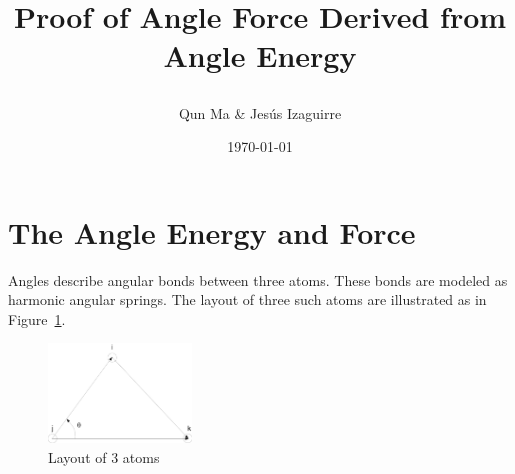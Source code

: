 \textheight 50pc
\textwidth 41pc
\topmargin -3.0pc
\oddsidemargin 0pc
\evensidemargin -1pc
\marginparsep -1pc
\marginparwidth 0pc


\newcommand{\comment}[1]{\textit{\small {#1}}}
\newcommand{\cpp}{C\texttt{++}\ }
\newcommand{\tcl}{\textsc{Tcl\ }}
\newcommand{\ProtoMol}{\textsc{ProtoMol\ }}
\newcommand{\SamdII}{\textsc{Samd 2\ }}
\newcommand{\MOLLY}{\textsc{MOLLY\ }}

\newcommand{\tempstart}{\texttt{<}}
\newcommand{\tempend}{\texttt{>}}
\newcommand{\rij}{\mbox{r$_{ij}$}}
\newcommand{\rik}{\mbox{r$_{ik}$}}
\newcommand{\vrij}{\mbox{$\vec{r}_{ij}$}}
\newcommand{\Si}[1]{\mbox{Si$_{#1}$}}
\newcommand{\Vr}[1]{\mbox{$\vec{r}_{#1}$}}
\newcommand{\Vx}[1]{\mbox{$\vec{x}_{#1}$}}
\newcommand{\hatr}[1]{\mbox{$\hat{{r}_{#1}}$}}
\newcommand{\AbsVr}[1]{\mbox{$\left| \vec{r}_{#1} \right| $}}



\title{
\begin{Large}
Proof of Angle Force Derived from Angle Energy
\end{Large}
\author{Qun Ma \& Jes\'us Izaguirre}}
\date{\today}
\maketitle

\parskip 0.3cm

\section{The Angle Energy and Force}
Angles describe angular bonds between three atoms. These bonds are
modeled as harmonic angular springs. The layout of three such atoms
are illustrated as in Figure~\ref{3atoms}.
\begin{figure}[hbt]
\centerline{\includegraphics[width=1.5in]{3atoms.pdf}}
\caption{Layout of 3 atoms}
\label{3atoms}
\end{figure}

